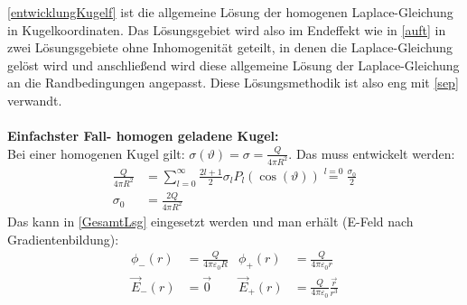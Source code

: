 		   \ref{entwicklungKugelf} ist die allgemeine Lösung der homogenen Laplace-Gleichung in Kugelkoordinaten. Das Lösungsgebiet wird also im Endeffekt wie in \ref{auft} in zwei Lösungsgebiete ohne Inhomogenität geteilt, in denen die Laplace-Gleichung gelöst wird und anschließend wird diese allgemeine Lösung der Laplace-Gleichung an die Randbedingungen angepasst. Diese Lösungsmethodik ist also eng mit \ref{sep} verwandt.\\\\
	  \textbf{Einfachster Fall- homogen geladene Kugel:}\\
			   Bei einer homogenen Kugel gilt: $\sigma(\vartheta) = \sigma = \frac{Q}{4\pi R^2}$. Das muss entwickelt werden:
			        \begin{equation}\begin{split}
					        \frac{Q}{4\pi R^2} & = \sum_{l=0}^\infty \frac{2l+1}{2}\sigma_l P_l(\cos(\vartheta)) \stackrel{l=0}{=} \frac{\sigma_0}{2}\\
					        \sigma_0 &= \frac{2Q}{4\pi R^2}
				        \end{split}\end{equation}
			   Das kann in \ref{GesamtLsg} eingesetzt werden und man erhält (E-Feld nach Gradientenbildung):
			        \begin{align}
				        \phi_-(r)     & = \frac{Q}{4\pi\varepsilon_0 R} & \phi_+(r)     & = \frac{Q}{4\pi\varepsilon_0 r}                    \\
				        \vec{E}_- (r) & = \vec{0}                       & \vec{E}_+ (r) & = \frac{Q}{4\pi\varepsilon_0} \frac{\vec{r} }{r^3}
			        \end{align}

